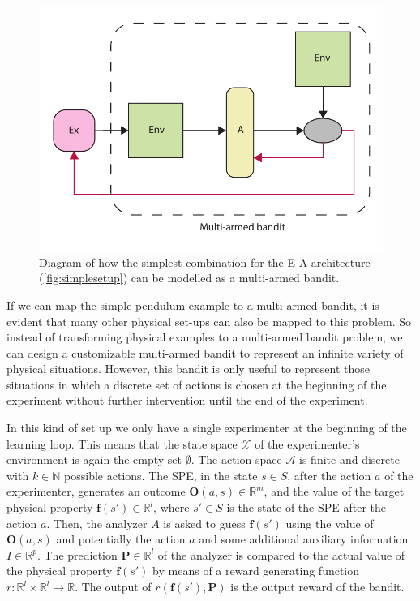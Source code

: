 \documentclass[11pt,a4paper,twoside]{report}
\newcommand{\+}{\textnormal{+} }
\theoremstyle{definition}
\numberwithin{equation}{chapter}
\begin{document}
\begin{figure}
  \centering 
\includegraphics[scale=0.75]{figures/Bandit-EA.pdf}
\caption{Diagram of how the simplest combination for the E-A architecture
(\ref{fig:simplesetup}) can be modelled as a multi-armed bandit.}
\label{fig:Bandit-EA}
\end{figure}



\par If we can map the simple pendulum example to a multi-armed bandit, it is
evident that many other physical set-ups can also be mapped to this problem. So
instead of transforming physical examples to a multi-armed bandit problem, we
can design a customizable multi-armed bandit to represent an infinite variety of
physical situations. However, this bandit is only useful to represent those
situations in which a discrete set of actions is chosen at the beginning of the
experiment without further intervention until the end of the experiment.

In this kind of set up we only have a single experimenter at the beginning of
the learning loop. This means that the state space $\mathcal{X}$  of the
experimenter's environment is again the empty set $\emptyset$. The action space
$\mathcal{A}$ is finite and discrete with $k \in \mathbb{N}$ possible actions.
The SPE, in the state $s \in S$, after the action $a$ of the experimenter,
generates an outcome $\textbf{O}(a,s) \in \mathbb{R}^m$, and the value of the
target physical property $\textbf{f}(s') \in \mathbb{R}^l$, where $s' \in S$ is
the state of the SPE after the action $a$. Then, the analyzer $A$ is asked to
guess $\textbf{f}(s')$ using the value of $\textbf{O}(a,s)$ and potentially the
action $a$ and some additional auxiliary information $I \in  \mathbb{R}^{p}$.
The prediction $\textbf{P} \in \mathbb{R}^l$ of the analyzer is compared to the
actual value of the physical property $\textbf{f}(s')$ by means of a reward
generating function $r:\mathbb{R}^l\times\mathbb{R}^l\rightarrow\mathbb{R}$. The
output of $r(\textbf{f}(s'),\textbf{P})$ is the output reward of the bandit.
\end{document}
